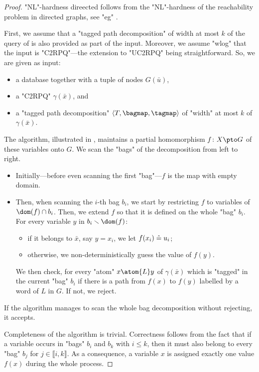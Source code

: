 \begin{proof}
	 "NL"-hardness direected follows from the "NL"-hardness of
	the reachability problem in directed graphs, see "eg" \cite[Theorem~4.18, p.~89]{AroraBarak2009ComputationalComplexity}.

	First, we assume that a "tagged path decomposition" of width at most $k$ of the query of
	is also provided as part of the input. Moreover, we assume "wlog" that the input is "C2RPQ"---the extension to "UC2RPQ" being straightforward. So, we are given as input:
	\begin{itemize}
		\item a database together with a tuple of nodes $G(\bar u)$,
		\item a "C2RPQ" $\gamma(\bar x)$, and
		\item a "tagged path decomposition" $\langle T, \bagmap, \tagmap \rangle$ of "width" at 	
			most $k$ of $\gamma(\bar x)$.
	\end{itemize}
	The algorithm, illustrated in , maintains a partial homomorphism
	$f\colon X \pto G$
	of these variables onto $G$.
	We scan the "bags" of the decomposition from left to right.
	\begin{itemize}
		\item Initially---before even scanning the first "bag"---$f$ is the map with empty domain.
		\item Then, when scanning the $i$-th bag $b_i$,
			we start by restricting $f$ to variables of $\dom(f)\cap b_i$.
			Then, we extend $f$ so that it is defined on the whole "bag" $b_i$.
			For every variable $y$ in $b_i \smallsetminus\dom(f)$:
			\begin{itemize}
				\item if it belongs to $\bar x$, say $y = x_i$, 
					we let $f(x_i) \mathrel{\hat{=}} u_i$;
				\item otherwise, we non-deterministically guess the value of $f(y)$.
			\end{itemize}
			We then check, for every "atom" $x \atom{L} y$ of $\gamma(\bar x)$ which is "tagged" in 
			the current "bag" $b_i$ if there is a path from $f(x)$ to $f(y)$ labelled by a word of $L$ in $G$. If not, we reject. 
	\end{itemize}
	If the algorithm manages to scan the whole bag decomposition without rejecting, it accepts.

	Completeness of the algorithm is trivial. Correctness follows from the fact that if
	a variable occurs in "bags" $b_i$ and $b_k$ with $i \leq k$, then it must also belong to every
	"bag" $b_j$ for $j \in \lBrack i,k \rBrack$. As a consequence, a variable $x$ is assigned 
	exactly one value $f(x)$ during the whole process. 


\end{proof}
